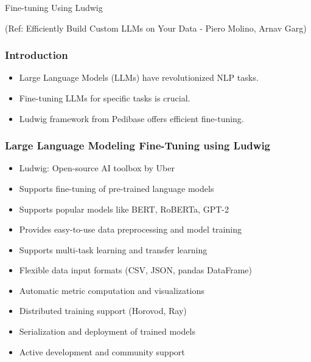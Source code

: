 \begin{frame}[fragile]\frametitle{}
\begin{center}
{\Large Fine-tuning Using Ludwig}

{\tiny (Ref: Efficiently Build Custom LLMs on Your Data - Piero Molino,  Arnav Garg)}

\end{center}
\end{frame}

\begin{frame}[fragile]\frametitle{Introduction}
    \begin{itemize}
        \item Large Language Models (LLMs) have revolutionized NLP tasks.
        \item Fine-tuning LLMs for specific tasks is crucial.
        \item Ludwig framework from Pedibase offers efficient fine-tuning.
    \end{itemize}
\end{frame}


\begin{frame}[fragile]\frametitle{Large Language Modeling Fine-Tuning using Ludwig}
\begin{itemize}
    \item Ludwig: Open-source AI toolbox by Uber
    \item Supports fine-tuning of pre-trained language models
    \item Supports popular models like BERT, RoBERTa, GPT-2
    \item Provides easy-to-use data preprocessing and model training
    \item Supports multi-task learning and transfer learning
    \item Flexible data input formats (CSV, JSON, pandas DataFrame)
    \item Automatic metric computation and visualizations
    \item Distributed training support (Horovod, Ray)
    \item Serialization and deployment of trained models
    \item Active development and community support
\end{itemize}
\end{frame}


